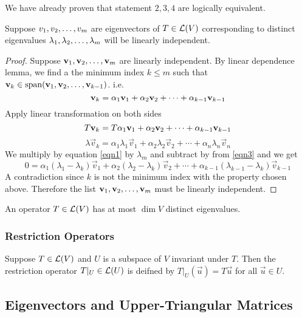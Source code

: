 We have already proven that statement $2,3,4$ are logically equivalent. 
\begin{theorem}
    Suppose ${v}_1,{v}_2, \ldots, {v}_{m}$ are eigenvectors of $T \in \mathcal L(V)$ corresponding to distinct eigenvalues ${\lambda}_1,{\lambda}_2, \ldots, {\lambda}_{m}$ will be linearly independent.
\end{theorem}
\begin{proof}
Suppose ${\mathbf v}_1,{\mathbf v}_2, \ldots, {\mathbf v}_{m}$ are linearly independent. By linear dependence lemma, we find a the minimum index $k \leq m$ such that $\mathbf v_k \in \text{span} ({\mathbf v}_1,{\mathbf v}_2, \ldots, {\mathbf v}_{k-1})$. i.e.
\begin{equation} \label{eqn1}
     \mathbf v_k = {\alpha}_1{\mathbf v}_1 + {\alpha}_2{\mathbf v}_2 + \cdots + {\alpha}_{k-1}{\mathbf v}_{k-1} 
\end{equation}
Apply linear transformation on both sides 
\begin{equation} \label{eqn2}
    T\mathbf v_k = T{\alpha}_1{\mathbf v}_1 + {\alpha}_2{\mathbf v}_2 + \cdots + {\alpha}_{k-1}{\mathbf v}_{k-1} 
\end{equation}
\begin{equation} \label{eqn3}
    \lambda \vec v_k = \alpha_1 \lambda_1 \vec v_1 + \alpha_2 \lambda_2 \vec v_2 + \cdots + \alpha_n \lambda_n \vec v_n 
\end{equation} 
We multiply by equation \ref{eqn1} by $\lambda_m$ and subtract by from \ref{eqn3} and we get \[ 0 = \alpha_1 (\lambda_1 - \lambda_k)\vec v_1 + \alpha_2(\lambda_2 - \lambda_k)\vec v_2 + \cdots + \alpha_{k-1} (\lambda_{k-1} - \lambda_k)\vec v_{k-1}\]
A contradiction since $k$ is not the minimum index with the property chosen above. Therefore the list ${\mathbf v}_1,{\mathbf v}_2, \ldots, {\mathbf v}_{m}$ must be linearly independent.
\end{proof}
\begin{corollary}
An operator $T \in \mathcal L(V)$ has at most $\boxed{\dim V}$ distinct eigenvalues.
\end{corollary}
\subsubsection{Restriction Operators}
\begin{definition}
    Suppose $T \in \mathcal L(V)$ and $U$ is a subspace of $V$ invariant under $T$. Then the restriction operator $T|_U \in \mathcal L(U)$ is deifned by $T|_U(\vec u) = T\vec u$ for all $\vec u \in U$.
\end{definition}
\subsection{Eigenvectors and Upper-Triangular
Matrices}

